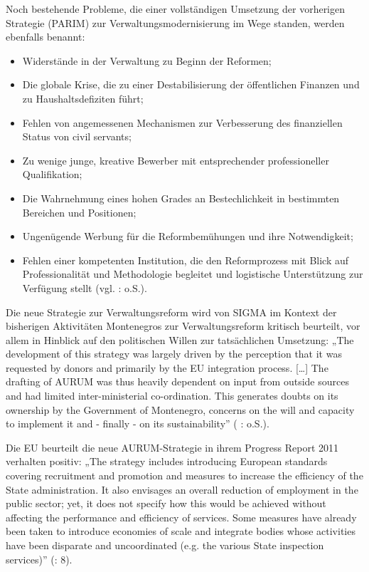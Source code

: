 Noch bestehende Probleme, die einer vollständigen Umsetzung der vorherigen Strategie (PARIM) zur Verwaltungsmodernisierung im Wege standen, werden ebenfalls benannt:
\begin{itemize} \itemsep1pt \parskip0pt 
\item Widerstände in der Verwaltung zu Beginn der Reformen;
\item Die globale Krise, die zu einer Destabilisierung der öffentlichen Finanzen und zu Haushaltsdefiziten führt;
\item Fehlen von angemessenen Mechanismen zur Verbesserung des finanziellen Status von civil servants;
\item Zu wenige junge, kreative Bewerber mit entsprechender professioneller Qualifikation;
\item Die Wahrnehmung eines hohen Grades an Bestechlichkeit in bestimmten Bereichen und Positionen;
\item Ungenügende Werbung für die Reformbemühungen und ihre Notwendigkeit;
\item Fehlen einer kompetenten Institution, die den Reformprozess mit Blick auf Professionalität und Methodologie begleitet und logistische Unterstützung zur Verfügung stellt (vgl. \cite{govmont11}: o.S.).
\end{itemize}
Die neue Strategie zur Verwaltungsreform wird von SIGMA im Kontext der bisherigen Aktivitäten Montenegros zur Verwaltungsreform kritisch beurteilt, vor allem in Hinblick auf den politischen Willen zur tatsächlichen Umsetzung: „The development of this strategy was largely driven by the perception that it was requested by donors and primarily by the EU integration process. […] The drafting of AURUM was thus heavily dependent on input from outside sources and had limited inter-ministerial co-ordination. This generates doubts on its ownership by the Government of Montenegro, concerns on the will and capacity to implement it and - finally - on its sustainability” ( \cite{oecd11a}: o.S.).
\par
Die EU beurteilt die neue AURUM-Strategie in ihrem Progress Report 2011 verhalten positiv: „The strategy includes introducing European standards covering recruitment and promotion and measures to increase the efficiency of the State administration. It also envisages an overall reduction of employment in the public sector; yet, it does not specify how this would be achieved without affecting the performance and efficiency of services. Some measures have already been taken to introduce economies of scale and integrate bodies whose activities have been disparate and uncoordinated (e.g. the various State inspection services)” (\cite{eurcom11c}: 8).\par
